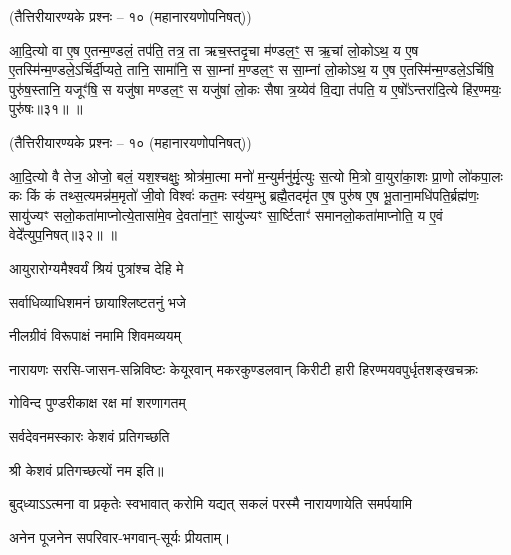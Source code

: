 \centerline{\normalsize (तैत्तिरीयारण्यके प्रश्नः – १० (महानारयणोपनिषत्))}
आ॒दि॒त्यो वा ए॒ष ए॒तन्म॒ण्डलं॒ तप॑ति॒ तत्र॒ ता ऋच॒स्तदृ॒चा म॑ण्डल॒ꣳ॒ स ऋ॒चां लो॒कोऽथ॒ य ए॒ष ए॒तस्मि॑न्म॒ण्डले॒ऽर्चिर्दी॒प्यते॒ तानि॒ सामा॑नि॒ स सा॒म्नां म॒ण्डल॒ꣳ॒ स सा॒म्नां लो॒कोऽथ॒ य ए॒ष ए॒तस्मि॑न्म॒ण्डले॒ऽर्चिषि॒ पुरु॑ष॒स्तानि॒ यजूꣳ॑षि॒ स यजु॑षा मण्डल॒ꣳ॒ स यजु॑षां लो॒कः सैषा त्र॒य्येव॑ वि॒द्या त॑पति॒ य ए॒षो᳚ऽन्तरा॑दि॒त्ये हि॑र॒ण्मयः॒ पुरु॑षः॥३१॥
\devAya{}॥


\centerline{\normalsize (तैत्तिरीयारण्यके प्रश्नः – १० (महानारयणोपनिषत्))}
आ॒दि॒त्यो वै तेज॒ ओजो॒ बलं॒ यश॒श्चक्षुः॒ श्रोत्र॑मा॒त्मा मनो॑ म॒न्युर्मनु॑र्मृ॒त्युः स॒त्यो मि॒त्रो वा॒युरा॑का॒शः प्रा॒णो लो॑कपा॒लः कः किं कं तथ्स॒त्यमन्न॑म॒मृतो॑ जी॒वो विश्वः॑ कत॒मः स्व॑य॒म्भु ब्रह्मै॒तदमृ॑त ए॒ष पुरु॑ष ए॒ष भू॒ताना॒मधि॑पति॒र्ब्रह्म॑णः॒ सायु॑ज्यꣳ सलो॒कता॑माप्नोत्ये॒तासा॑मे॒व दे॒वता॑ना॒ꣳ॒ सायु॑ज्यꣳ सा॒र्ष्टिताꣳ॑ समानलो॒कता॑माप्नोति॒ य ए॒वं वेदे᳚त्युप॒निषत्॥३२॥
\devAya{}॥

\begingroup
\setlength{\parindent}{1.5em}
\makeatletter
  \def\vhrulefill#1{\leavevmode\leaders\hrule\@height#1\hfill \kern\z@}
\makeatother
\newcommand{\anuvakamend}[1][]{\refstepcounter{anuvakam}%
\newline\centerline{\devAya{}।}
\centerline{\textbf{ॐ नमो नारायणाय॥}}
\newline\mbox{}
\baselineskip=12pt\nolinebreak[4]\vhrulefill{1.6pt}\raisebox{-3pt}{\bfseries{[\devanumber{\arabic{anuvakam}}]}}%
\vspace{-1pt}
}
\renewcommand{\sect}[1]{}

\endgroup
\begingroup
\let\chapt\sect

\endgroup


\begin{center}

{आयुरारोग्यमैश्वर्यं श्रियं पुत्रांश्च देहि मे}

{सर्वाधिव्याधिशमनं छायाश्लिष्टतनुं भजे}

{नीलग्रीवं विरूपाक्षं नमामि शिवमव्ययम्}

{नारायणः सरसि-जासन-सन्निविष्टः}
{केयूरवान् मकरकुण्डलवान् किरीटी}
{हारी हिरण्मयवपुर्धृतशङ्खचक्रः}

{गोविन्द पुण्डरीकाक्ष रक्ष मां शरणागतम्}

{सर्वदेवनमस्कारः केशवं प्रतिगच्छति}

श्री केशवं प्रतिगच्छत्यों नम इति॥



{बुद्‌ध्याऽऽत्मना वा प्रकृतेः स्वभावात्}
{करोमि यद्यत् सकलं परस्मै}
{नारायणायेति समर्पयामि}

अनेन पूजनेन सपरिवार-भगवान्-सूर्यः प्रीयताम्। \\
\end{center}

